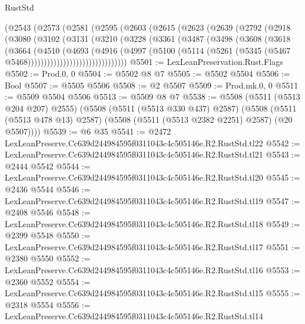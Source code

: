 \begin{lexlean}{RustStd}
\begin{coremodule}
      (@2543
        (@2573
          (@2581
            (@2595
              (@2603
                (@2615
                  (@2623
                    (@2639
                      (@2792
                        (@2918
                          (@3080
                            (@3102
                              (@3131
                                (@3210
                                  (@3228
                                    (@3361
                                      (@3487
                                        (@3498
                                          (@3608
                                            (@3618
                                              (@3664
                                                (@4510
                                                  (@4693
                                                    (@4916
                                                      (@4997
                                                        (@5100
                                                          (@5114
                                                            (@5261
                                                              (@5345
                                                                (@5467
                                                                  @5468)))))))))))))))))))))))))))))))
@5501 := LexLeanPreservation.Rust.Flags
@5502 := Prod.{0, 0}
@5504 := @5502 @8 @7
@5505 := @5502 @5504
@5506 := Bool
@5507 := @5505 @5506
@5508 := @2 @5507
@5509 := Prod.mk.{0, 0}
@5511 := @5509 @5504 @5506
@5513 := @5509 @8 @7
@5538 := @5508
    (@5511 (@5513 @204 @207) @2555)
    (@5508
      (@5511 (@5513 @330 @437) @2587)
      (@5508 (@5511 (@5513 @478 @13) @2587) (@5508 (@5511 (@5513 @2382 @2251) @2587) (@20 @5507))))
@5539 := @6 @35
@5541 := @2472 LexLeanPreserve.Cc639d244984595f0311043c4c505146e.R2.RustStd.tl22
@5542 := LexLeanPreserve.Cc639d244984595f0311043c4c505146e.R2.RustStd.tl21
@5543 := @2444 @5542
@5544 := LexLeanPreserve.Cc639d244984595f0311043c4c505146e.R2.RustStd.tl20
@5545 := @2436 @5544
@5546 := LexLeanPreserve.Cc639d244984595f0311043c4c505146e.R2.RustStd.tl19
@5547 := @2408 @5546
@5548 := LexLeanPreserve.Cc639d244984595f0311043c4c505146e.R2.RustStd.tl18
@5549 := @2399 @5548
@5550 := LexLeanPreserve.Cc639d244984595f0311043c4c505146e.R2.RustStd.tl17
@5551 := @2380 @5550
@5552 := LexLeanPreserve.Cc639d244984595f0311043c4c505146e.R2.RustStd.tl16
@5553 := @2360 @5552
@5554 := LexLeanPreserve.Cc639d244984595f0311043c4c505146e.R2.RustStd.tl15
@5555 := @2318 @5554
@5556 := LexLeanPreserve.Cc639d244984595f0311043c4c505146e.R2.RustStd.tl14

\end{coremodule}
\end{lexlean}
